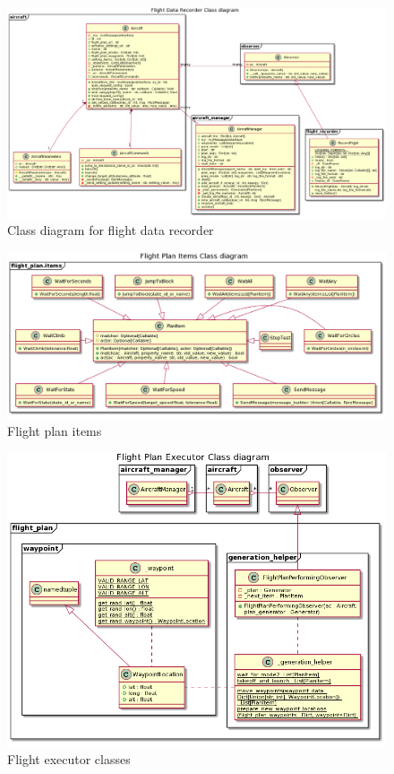 \begin{landscape}
\begin{figure}[!h]
    \centering
    \includegraphics[width=.7\paperheight]{UML/FDR_class_diagram.png}
    \caption{Class diagram for flight data recorder}
    \label{fig:fdr_class_diagram}
\end{figure}
\end{landscape}

\begin{figure}
    \centering
    \includegraphics[width=\textwidth]{UML/Flight_plan_items_CD.png}
    \caption{Flight plan items}
    \label{fig:flight_plan_items_class_diagram}
\end{figure}

\begin{figure}
    \centering
    \includegraphics[width=\textwidth]{UML/flight_plan_executor_CD.png}
    \caption{Flight executor classes}
    \label{fig:flight_plan_executor_class_diagram}
\end{figure}

